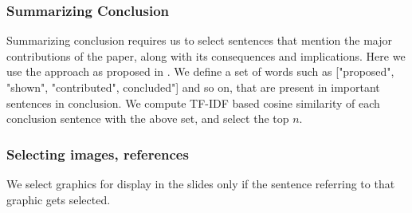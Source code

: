 \subsubsection{Summarizing Conclusion}
Summarizing conclusion requires us to select sentences that mention the
major contributions of the paper, along with its consequences and implications.
Here we use the approach as proposed in \cite{sravanthi}. We define a set of words	
such as ["proposed", "shown", "contributed", concluded"] and so on, that 
are present in important sentences in conclusion. We compute TF-IDF based cosine similarity of
each conclusion sentence with the above set, and select the top  $n$.

\subsubsection{Selecting images, references}
We select graphics for display in the slides only if the sentence referring to that graphic
gets selected.